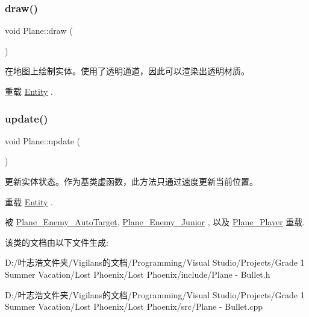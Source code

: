\subsubsection{\texorpdfstring{draw()}{draw()}}
{\footnotesize\ttfamily void Plane\+::draw (\begin{DoxyParamCaption}{ }\end{DoxyParamCaption})\hspace{0.3cm}{\ttfamily [virtual]}}



在地图上绘制实体。使用了透明通道，因此可以渲染出透明材质。 



重载 \hyperlink{class_entity_a7666f416dd0d1fce0f1133f78df44476}{Entity} .

\mbox{\label{class_plane_a7fbb07f76503fe057772e01f542afc32}} 
\subsubsection{\texorpdfstring{update()}{update()}}
{\footnotesize\ttfamily void Plane\+::update (\begin{DoxyParamCaption}{ }\end{DoxyParamCaption})\hspace{0.3cm}{\ttfamily [virtual]}}



更新实体状态。作为基类虚函数，此方法只通过速度更新当前位置。 



重载 \hyperlink{class_entity_a00b6eeaf99b35c8f8b10b5fbfc1baf4f}{Entity} .



被 \hyperlink{class_plane___enemy___auto_target_acae2a6f38bdc71d17188e2b7711f4d5b}{Plane\+\_\+\+Enemy\+\_\+\+Auto\+Target}, \hyperlink{class_plane___enemy___junior_a686e46c9927793dd07235cac72d52405}{Plane\+\_\+\+Enemy\+\_\+\+Junior} , 以及 \hyperlink{class_plane___player_ae68c08ce11fad9fd164c00eb4db6b348}{Plane\+\_\+\+Player} 重载.



该类的文档由以下文件生成\+:\begin{DoxyCompactItemize}
\item 
D\+:/叶志浩文件夹/\+Vigilans的文档/\+Programming/\+Visual Studio/\+Projects/\+Grade 1 Summer Vacation/\+Lost Phoenix/\+Lost Phoenix/include/Plane -\/ Bullet.\+h\item 
D\+:/叶志浩文件夹/\+Vigilans的文档/\+Programming/\+Visual Studio/\+Projects/\+Grade 1 Summer Vacation/\+Lost Phoenix/\+Lost Phoenix/src/Plane -\/ Bullet.\+cpp\end{DoxyCompactItemize}
